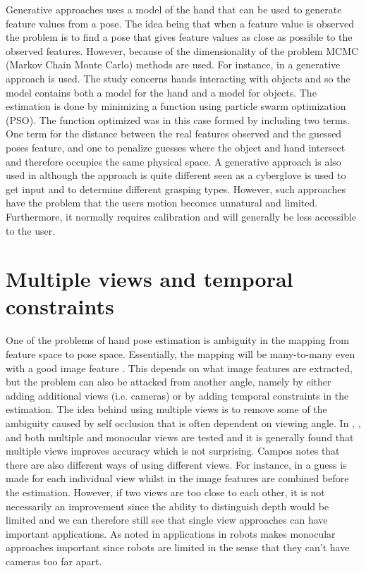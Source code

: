 \documentclass[a4paper,11pt]{kth-mag}
\begin{document}
Generative approaches uses a model of the hand that can be used to generate feature values from a pose.
The idea being that when a feature value is observed the problem is to find a pose that gives feature values as close as possible to the observed features.
However, because of the dimensionality of the problem MCMC (Markov Chain Monte Carlo) methods are used.
For instance, in \cite{fullDOF} a generative approach is used.
The study concerns hands interacting with objects and so the model contains both a model for the hand and a model for objects.
The estimation is done by minimizing a function using particle swarm optimization (PSO).
The function optimized was in this case formed by including two terms.
One term for the distance between the real features observed and the guessed poses feature, and one to penalize guesses where the object and hand intersect and therefore occupies the same physical space.
A generative approach is also used in \cite{cyberglove} although the approach is quite different seen as a cyberglove is used to get input and to determine different grasping types.
However, such approaches have the problem that the users motion becomes unnatural and limited.
Furthermore, it normally requires calibration and will generally be less accessible to the user.


\section{Multiple views and temporal constraints}
\label{sec:temporal}
One of the problems of hand pose estimation is ambiguity in the mapping from feature space to pose space.
Essentially, the mapping will be many-to-many even with a good image feature \cite{monocular}.
This depends on what image features are extracted, but the problem can also be attacked from another angle, namely by either adding additional views (i.e. cameras) or by adding temporal constraints in the estimation.
The idea behind using multiple views is to remove some of the ambiguity caused by self occlusion that is often dependent on viewing angle.
In \cite{exampleBased}, \cite{pictorial}, and \cite{regressionBased} both multiple and monocular views are tested and it is generally found that multiple views improves accuracy which is not surprising.
Campos notes that there are also different ways of using different views\cite{regressionBased}.
For instance, in \cite{regressionBased} a guess is made for each individual view whilst in \cite{exampleBased} the image features are combined before the estimation.  
However, if two views are too close to each other, it is not necessarily an improvement since the ability to distinguish depth would be limited and we can therefore still see that single view approaches can have important applications.
As noted in \cite{monocular} applications in robots makes monocular approaches important since robots are limited in the sense that they can't have cameras too far apart.
\end{document}
